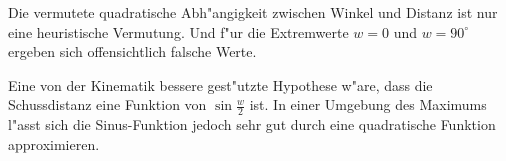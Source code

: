 \begin{diskussion}
Die vermutete quadratische Abh"angigkeit zwischen Winkel und Distanz
ist nur eine heuristische Vermutung.
Und f"ur die Extremwerte $w=0$ und $w=90^\circ$ ergeben sich offensichtlich
falsche Werte.

Eine von der Kinematik bessere gest"utzte Hypothese w"are, dass
die Schussdistanz eine Funktion von $\sin \frac{w}2$ ist.
In einer Umgebung des Maximums l"asst sich die Sinus-Funktion jedoch
sehr gut durch eine quadratische Funktion approximieren.
\end{diskussion}



